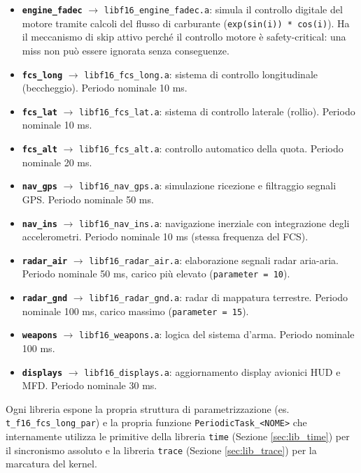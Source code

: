 \begin{itemize}
	\item \textbf{\texttt{engine\_fadec}} $\rightarrow$ \texttt{libf16\_engine\_fadec.a}: simula il controllo digitale del motore tramite calcoli del flusso di carburante (\texttt{exp(sin(i)) * cos(i)}). Ha il meccanismo di skip attivo perché il controllo motore è safety-critical: una miss non può essere ignorata senza conseguenze.
	\item \textbf{\texttt{fcs\_long}} $\rightarrow$ \texttt{libf16\_fcs\_long.a}: sistema di controllo longitudinale (beccheggio). Periodo nominale 10 ms.
	\item \textbf{\texttt{fcs\_lat}} $\rightarrow$ \texttt{libf16\_fcs\_lat.a}: sistema di controllo laterale (rollio). Periodo nominale 10 ms.
	\item \textbf{\texttt{fcs\_alt}} $\rightarrow$ \texttt{libf16\_fcs\_alt.a}: controllo automatico della quota. Periodo nominale 20 ms.
	\item \textbf{\texttt{nav\_gps}} $\rightarrow$ \texttt{libf16\_nav\_gps.a}: simulazione ricezione e filtraggio segnali GPS. Periodo nominale 50 ms.
	\item \textbf{\texttt{nav\_ins}} $\rightarrow$ \texttt{libf16\_nav\_ins.a}: navigazione inerziale con integrazione degli accelerometri. Periodo nominale 10 ms (stessa frequenza del FCS).
	\item \textbf{\texttt{radar\_air}} $\rightarrow$ \texttt{libf16\_radar\_air.a}: elaborazione segnali radar aria-aria. Periodo nominale 50 ms, carico più elevato (\texttt{parameter = 10}).
	\item \textbf{\texttt{radar\_gnd}} $\rightarrow$ \texttt{libf16\_radar\_gnd.a}: radar di mappatura terrestre. Periodo nominale 100 ms, carico massimo (\texttt{parameter = 15}).
	\item \textbf{\texttt{weapons}} $\rightarrow$ \texttt{libf16\_weapons.a}: logica del sistema d'arma. Periodo nominale 100 ms.
	\item \textbf{\texttt{displays}} $\rightarrow$ \texttt{libf16\_displays.a}: aggiornamento display avionici HUD e MFD. Periodo nominale 30 ms.
\end{itemize}

Ogni libreria espone la propria struttura di parametrizzazione (es. \texttt{t\_f16\_fcs\_long\_par}) e la propria funzione \texttt{PeriodicTask\_<NOME>} che internamente utilizza le primitive della libreria \texttt{time} (Sezione \ref{sec:lib_time}) per il sincronismo assoluto e la libreria \texttt{trace} (Sezione \ref{sec:lib_trace}) per la marcatura del kernel.


